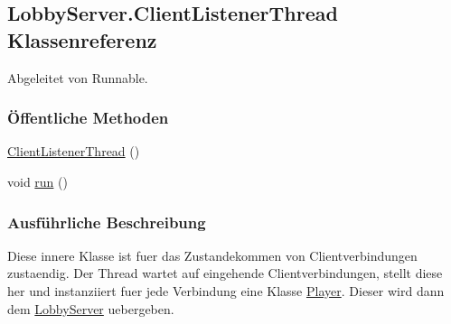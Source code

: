 \hypertarget{a00075}{\subsection{Lobby\-Server.\-Client\-Listener\-Thread Klassenreferenz}
\label{a00075}
}


Abgeleitet von Runnable.

\subsubsection*{Öffentliche Methoden}
\begin{DoxyCompactItemize}
\item 
\hypertarget{a00075_aed0a888ec8e223a5e13ade3ec8c785dc}{\hyperlink{a00075_aed0a888ec8e223a5e13ade3ec8c785dc}{Client\-Listener\-Thread} ()}\label{a00075_aed0a888ec8e223a5e13ade3ec8c785dc}

\item 
\hypertarget{a00075_a13a43e6d814de94978c515cb084873b1}{void \hyperlink{a00075_a13a43e6d814de94978c515cb084873b1}{run} ()}\label{a00075_a13a43e6d814de94978c515cb084873b1}

\end{DoxyCompactItemize}


\subsubsection{Ausführliche Beschreibung}
Diese innere Klasse ist fuer das Zustandekommen von Clientverbindungen zustaendig. Der Thread wartet auf eingehende Clientverbindungen, stellt diese her und instanziiert fuer jede Verbindung eine Klasse \hyperlink{a00076}{Player}. Dieser wird dann dem \hyperlink{a00074}{Lobby\-Server} uebergeben. 